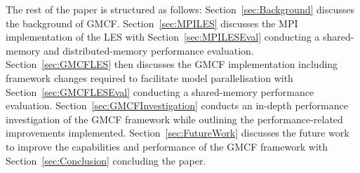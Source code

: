 The rest of the paper is structured as follows: Section~\ref{sec:Background}
discusses the background of GMCF. Section~\ref{sec:MPILES} discusses the MPI
implementation of the LES with Section~\ref{sec:MPILESEval} conducting a
shared-memory and distributed-memory performance evaluation.
Section~\ref{sec:GMCFLES} then discusses the GMCF implementation including
framework changes required to facilitate model parallelisation with
Section~\ref{sec:GMCFLESEval} conducting a shared-memory performance evaluation.
Section~\ref{sec:GMCFInvestigation} conducts an in-depth performance
investigation of the GMCF framework while outlining the performance-related
improvements implemented. Section~\ref{sec:FutureWork} discusses the future work
to improve the capabilities and performance of the GMCF framework with
Section~\ref{sec:Conclusion} concluding the paper.
